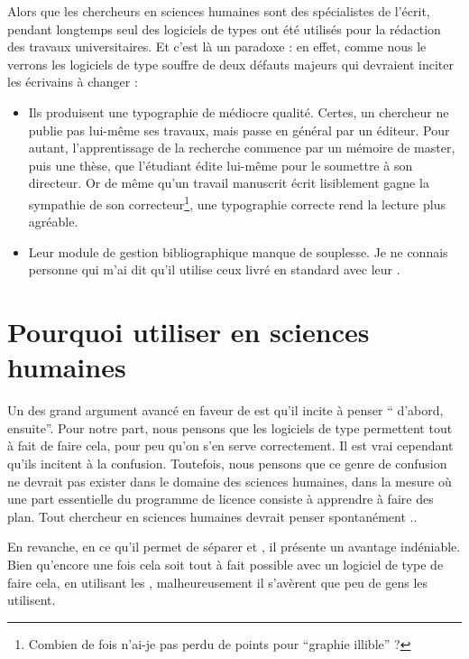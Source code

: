 Alors que les chercheurs en sciences humaines sont des spécialistes de l'écrit, pendant longtemps seul des logiciels de types  ont été utilisés pour la rédaction des travaux universitaires. Et c'est là un paradoxe : en effet, comme nous le verrons les logiciels de type  souffre de deux défauts majeurs qui devraient inciter les écrivains à changer :
\begin{itemize}
\item Ils produisent une typographie de médiocre qualité. Certes, un chercheur ne publie pas lui-même ses travaux, mais passe en général par un éditeur. Pour autant, l'apprentissage de la recherche commence par un mémoire de master, puis une thèse, que l'étudiant édite lui-même pour le soumettre à son directeur. Or de même qu'un travail manuscrit écrit lisiblement gagne la sympathie de son correcteur\footnote{Combien de fois n'ai-je pas perdu de points pour \enquote{graphie illible} ?},  une typographie correcte rend la lecture plus agréable.
\item Leur module de gestion bibliographique manque de souplesse. Je ne connais personne qui m'ai dit qu'il utilise ceux livré en standard avec leur .
\end{itemize}

\section{Pourquoi utiliser  en sciences humaines}

Un des grand argument avancé en faveur de \concept{\LaTeX} est qu'il incite à penser \enquote{ d'abord,  ensuite}. Pour notre part, nous pensons que les logiciels de type  permettent tout à fait de faire cela, pour peu qu'on s'en serve correctement. Il est vrai cependant qu'ils incitent à la confusion. Toutefois, nous pensons que ce genre de confusion ne devrait pas exister dans le domaine des sciences humaines, dans la mesure où une part essentielle du programme de licence consiste à apprendre à faire des plan. Tout chercheur en sciences humaines devrait penser spontanément ..

En revanche, en ce qu'il permet de séparer  et , il présente un avantage indéniable. Bien qu'encore une fois cela soit tout à fait possible avec un logiciel de type  de faire cela, en utilisant les , malheureusement il s'avèrent que peu de gens les utilisent.


